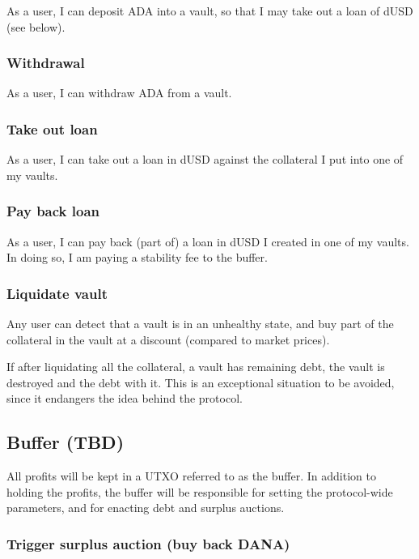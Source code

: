 \documentclass{article} %
\begin{document}
As a user, I can deposit ADA into a vault, so that I may take out a loan of dUSD
(see below).

\subsubsection{Withdrawal}

As a user, I can withdraw ADA from a vault.

\subsubsection{Take out loan}

As a user, I can take out a loan in dUSD against the collateral I put into one
of my vaults.

\subsubsection{Pay back loan}

As a user, I can pay back (part of) a loan in dUSD I created in one of my
vaults. In doing so, I am paying a stability fee to the buffer.

\subsubsection{Liquidate vault}

Any user can detect that a vault is in an unhealthy state, and buy part of the
collateral in the vault at a discount (compared to market prices).

If after liquidating all the collateral, a vault has remaining debt, the vault
is destroyed and the debt with it.
This is an exceptional situation to be avoided, since it endangers the idea
behind the protocol.

\subsection{Buffer (TBD)}

All profits will be kept in a UTXO referred to as the buffer.
In addition to holding the profits, the buffer will be responsible for setting
the protocol-wide parameters, and for enacting debt and surplus auctions.

\subsubsection{Trigger surplus auction (buy back DANA)}
\end{document}

